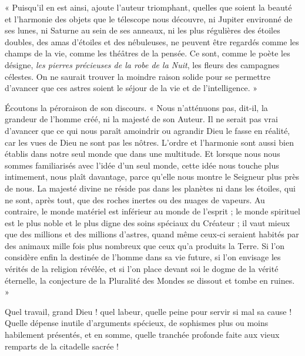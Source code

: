 \documentclass[a4paper, 11pt, oneside]{article}
\begin{document}
« Puisqu'il en est ainsi, ajoute l'auteur triomphant, quelles que soient la beauté et l'harmonie des objets que le télescope nous découvre, ni Jupiter environné de ses lunes, ni Saturne au sein de ses anneaux, ni les plus régulières des étoiles doubles, des amas d'étoiles et des nébuleuses, ne peuvent être regardés comme les champs de la vie, comme les théâtres de la pensée. Ce sont, comme le poète les désigne, \emph{les pierres précieuses de la robe de la Nuit}, les fleurs des campagnes célestes. On ne saurait trouver la moindre raison solide pour se permettre d'avancer que ces astres soient le séjour de la vie et de l'intelligence. »

Écoutons la péroraison de son discours. « Nous n'atténuons pas, dit-il, la grandeur de l'homme créé, ni la majesté de son Auteur. Il ne serait pas vrai d'avancer que ce qui nous paraît amoindrir ou agrandir Dieu le fasse en réalité, car les vues de Dieu ne sont pas les nôtres. L'ordre et l'harmonie sont aussi bien établis dans notre seul monde que dans une multitude. Et lorsque nous nous sommes familiarisés avec l'idée d'un seul monde, cette idée nous touche plus intimement, nous plaît davantage, parce qu'elle nous montre le Seigneur plus près de nous. La majesté divine ne réside pas dans les planètes ni dans les étoiles, qui ne sont, après tout, que des roches inertes ou des nuages de vapeurs. Au contraire, le monde matériel est inférieur au monde de l'esprit ; le monde spirituel est le plus noble et le plus digne des soins spéciaux du Créateur ; il vaut mieux que des millions et des millions d'astres, quand même ceux-ci seraient habités par des animaux mille fois plus nombreux que ceux qu'a produits la Terre. Si l'on considère enfin la destinée de l'homme dans sa vie future, si l'on envisage les vérités de la religion révélée, et si l'on place devant soi le dogme de la vérité éternelle, la conjecture de la Pluralité des Mondes se dissout et tombe en ruines. »

Quel travail, grand Dieu ! quel labeur, quelle peine pour servir si mal sa cause ! Quelle dépense inutile d'arguments spécieux, de sophismes plus ou moins habilement présentés, et en somme, quelle tranchée profonde faite aux vieux remparts de la citadelle sacrée !
\end{document}
